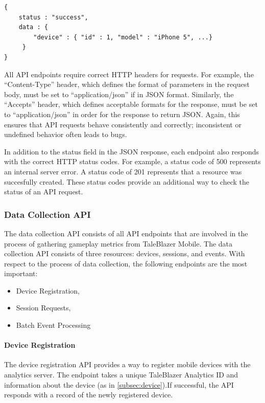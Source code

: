 \medskip
\begin{lstlisting}[caption={[API Response Format Example]Example API format, using JSEND}, label={lst:jsend}]
{
    status : "success",
    data : {
        "device" : { "id" : 1, "model" : "iPhone 5", ...}
     }
}
\end{lstlisting}

All API endpoints require correct HTTP headers for requests. For example, the ``Content-Type'' header, which defines the format of parameters in the request body, must be set to ``application/json'' if in JSON format. Similarly, the ``Accepts'' header, which defines acceptable formats for the response, must be set to ``application/json'' in order for the response to return JSON. Again, this ensures that API requests behave consistently and correctly; inconsistent or undefined behavior often leads to bugs.

In addition to the status field in the JSON response, each endpoint also responds with the correct HTTP status codes. For example, a status code of 500 represents an internal server error. A status code of 201 represents that a resource was succesfully created. These status codes provide an additional way to check the status of an API request.

\subsubsection{Data Collection API}
\label{subsec:collection_api}

The data collection API consists of all API endpoints that are involved in the process of gathering gameplay metrics from TaleBlazer Mobile. The data collection API consists of three resources: devices, sessions, and events. With respect to the process of data collection, the following endpoints are the most important:
	\begin{itemize}
		\item Device Registration,
		\item Session Requests,
		\item Batch Event Processing
	\end{itemize}

\paragraph{Device Registration}

The device registration API provides a way to register mobile devices with the analytics server. The endpoint takes a unique TaleBlazer Analytics ID and information about the device (as in \ref{subsec:device}).If successful, the API responds with a record of the newly registered device.

